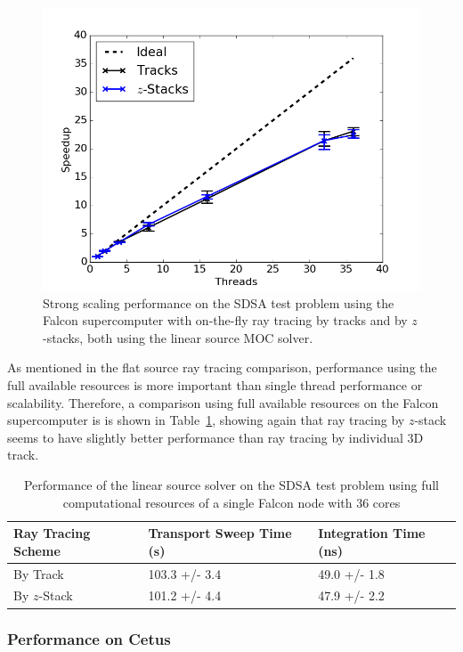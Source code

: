 \begin{figure}[h!]
	\centering
	\includegraphics[width=0.7\linewidth]{figures/results/performance/ls-scaling-comb-stacks-tracks.png}
	\caption[]{Strong scaling performance on the SDSA test problem using the Falcon supercomputer with on-the-fly ray tracing by tracks and by $z$-stacks, both using the linear source \ac{MOC} solver.}
	\label{fig:rt-parallel-ls}
\end{figure}

As mentioned in the flat source ray tracing comparison,  performance using the full available resources is more important than single thread performance or scalability. Therefore, a comparison using full available resources on the Falcon supercomputer is is shown in Table~\ref{tab:rt-full-thread-ls}, showing again that ray tracing by $z$-stack seems to have slightly better performance than ray tracing by individual 3D track.

\begin{table}[ht]
	\centering
	\caption{Performance of the linear source solver on the SDSA test problem using full computational resources of a single Falcon node with 36 cores}
	\medskip
	\begin{tabular}{l|l|l}
		\hline
		Ray Tracing Scheme & Transport Sweep Time (s) & Integration Time (ns) \\
		\hline
		By Track & 103.3 +/- 3.4 & 49.0 +/- 1.8 \\
		By $z$-Stack & 101.2 +/- 4.4 & 47.9 +/- 2.2 \\
		\hline
	\end{tabular}
	\label{tab:rt-full-thread-ls}
\end{table}

\subsubsection{Performance on Cetus}

